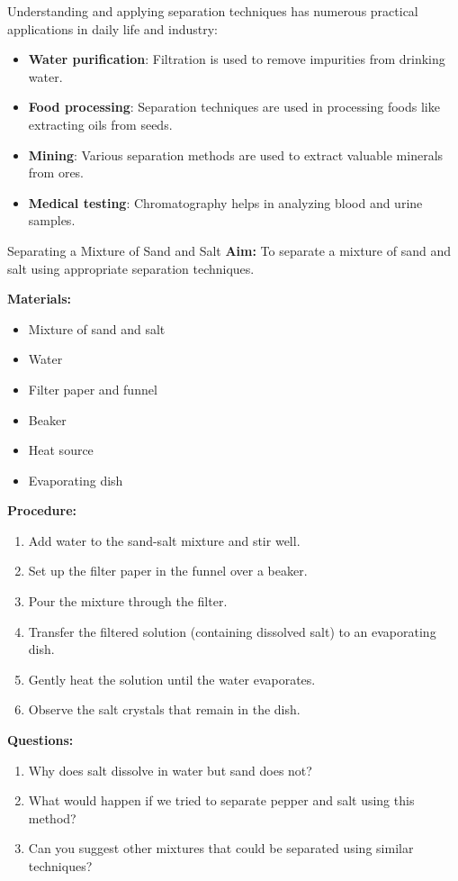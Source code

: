 Understanding and applying separation techniques has numerous practical applications in daily life and industry:

\begin{itemize}
    \item \textbf{Water purification}: Filtration is used to remove impurities from drinking water.
    \item \textbf{Food processing}: Separation techniques are used in processing foods like extracting oils from seeds.
    \item \textbf{Mining}: Various separation methods are used to extract valuable minerals from ores.
    \item \textbf{Medical testing}: Chromatography helps in analyzing blood and urine samples.
\end{itemize}

\begin{investigation}{Separating a Mixture of Sand and Salt}
\textbf{Aim:} To separate a mixture of sand and salt using appropriate separation techniques.

\textbf{Materials:} 
\begin{itemize}
    \item Mixture of sand and salt
    \item Water
    \item Filter paper and funnel
    \item Beaker
    \item Heat source
    \item Evaporating dish
\end{itemize}

\textbf{Procedure:}
\begin{enumerate}
    \item Add water to the sand-salt mixture and stir well.
    \item Set up the filter paper in the funnel over a beaker.
    \item Pour the mixture through the filter.
    \item Transfer the filtered solution (containing dissolved salt) to an evaporating dish.
    \item Gently heat the solution until the water evaporates.
    \item Observe the salt crystals that remain in the dish.
\end{enumerate}

\textbf{Questions:}
\begin{enumerate}
    \item Why does salt dissolve in water but sand does not?
    \item What would happen if we tried to separate pepper and salt using this method?
    \item Can you suggest other mixtures that could be separated using similar techniques?
\end{enumerate}
\end{investigation}

